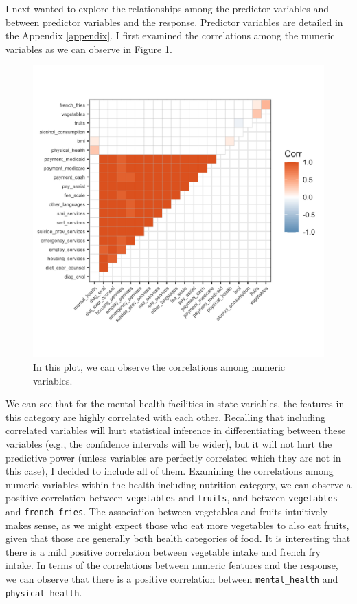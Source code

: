 \documentclass[
]{article}
\begin{document}
I next wanted to explore the relationships among the predictor variables and between predictor variables and the response. Predictor variables are detailed in the Appendix \ref{appendix}. I first examined the correlations among the numeric variables as we can observe in Figure \ref{fig:corr-among-numeric-variables-plot}.

\begin{figure}[H]

{\centering \includegraphics[width=0.8\linewidth]{../results/corr-among-numeric-variables-plot} 

}

\caption{In this plot, we can observe the correlations among numeric variables.}\label{fig:corr-among-numeric-variables-plot}
\end{figure}

We can see that for the mental health facilities in state variables, the features in this category are highly correlated with each other. Recalling that including correlated variables will hurt statistical inference in differentiating between these variables (e.g., the confidence intervals will be wider), but it will not hurt the predictive power (unless variables are perfectly correlated which they are not in this case), I decided to include all of them. Examining the correlations among numeric variables within the health including nutrition category, we can observe a positive correlation between \texttt{vegetables} and \texttt{fruits}, and between \texttt{vegetables} and \texttt{french\_fries}. The association between vegetables and fruits intuitively makes sense, as we might expect those who eat more vegetables to also eat fruits, given that those are generally both health categories of food. It is interesting that there is a mild positive correlation between vegetable intake and french fry intake. In terms of the correlations between numeric features and the response, we can observe that there is a positive correlation between \texttt{mental\_health} and \texttt{physical\_health}.
\end{document}
